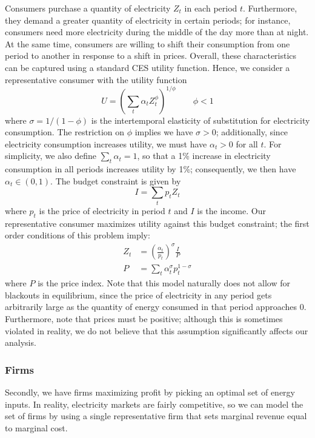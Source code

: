 \documentclass[11pt,a4paper,leqno]{extarticle}
\begin{document}
	Consumers purchase a quantity of electricity $Z_t$ in each period $t$. Furthermore, they demand a greater quantity of electricity in certain periods; for instance, consumers need more electricity during the middle of the day more than at night. At the same time, consumers are willing to shift their consumption from one period to another in response to a shift in prices. Overall, these characteristics can be captured using a standard CES utility function.  Hence, we consider a representative consumer with the utility function
	\begin{equation}
	U = \left( \sum_t \alpha_t Z_t^\phi  \right)^{1/\phi} \qquad \phi < 1
	\end{equation}
	where $\sigma = 1/(1-\phi)$ is the intertemporal elasticity of substitution for electricity consumption. The restriction on $\phi$ implies we have  $\sigma > 0$; additionally, since electricity consumption increases utility, we must have $\alpha_t > 0$ for all $t$.  For simplicity, we also define $\sum_t \alpha_t = 1$, so that a 1\% increase in electricity consumption in all periods increases utility by 1\%; consequently, we then have $\alpha_t \in (0,1)$. The budget constraint is given by
	\begin{equation}
	I = \sum_t p_t Z_t
	\end{equation}
	where $p_t$ is the price of electricity in period $t$ and $I$ is the income. Our representative consumer maximizes utility against this budget constraint; the first order conditions of this problem imply:
	\begin{align}\label{eq:demand}
	Z_t &= \left(\frac{\alpha_t}{p_t} \right)^\sigma \frac{I}{P} \\\label{eq:priceindex}
	P &= \sum_t \alpha_t^\sigma p_t^{1-\sigma}
	\end{align}
	where $P$ is the price index. Note that this model naturally does not allow for blackouts in equilibrium, since the price of electricity in any period gets arbitrarily large as the quantity of energy consumed in that period approaches 0. Furthermore, note that prices must be positive; although this is sometimes violated in reality, we do not believe that this assumption significantly affects our analysis. 
	
	\subsubsection{Firms}
	
	Secondly, we have firms maximizing profit by picking an optimal set of energy inputs. In reality, electricity markets are fairly competitive, so we can model the set of firms by using a single representative firm that sets marginal revenue equal to marginal cost. 
	
\end{document}
